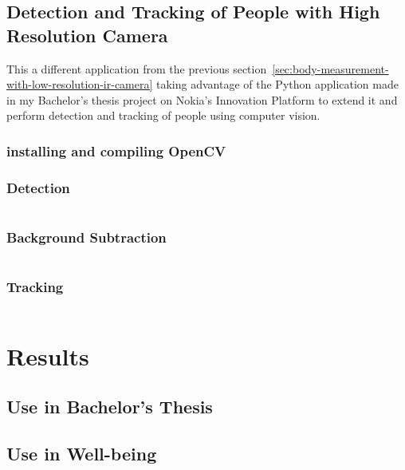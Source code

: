 \documentclass[hidelinks,11pt,a4paper,oneside,article]{memoir}
\begin{document}
\section{Detection and Tracking of People with High Resolution Camera}
This a different application from the previous section~\ref{sec:body-measurement-with-low-resolution-ir-camera} taking advantage of the Python application made in my Bachelor's thesis project on Nokia's Innovation Platform to extend it and perform detection and tracking of people using computer vision.

\subsection*{installing and compiling OpenCV}
\subsection*{Detection}

\begin{lstlisting}[label={listing:history},caption={Class to plot the graphic of temperatures},language=Python, style=styleprogramming]
\end{lstlisting}
\subsection*{Background Subtraction}

\begin{lstlisting}[label={listing:history},caption={Class to plot the graphic of temperatures},language=Python, style=styleprogramming]
\end{lstlisting}
\subsection*{Tracking}

\begin{lstlisting}[label={listing:history},caption={Class to plot the graphic of temperatures},language=Python, style=styleprogramming]
\end{lstlisting}

\clearpage
\chapter{Results}
\section{Use in Bachelor's Thesis}
\section{Use in Well-being}
\end{document}
